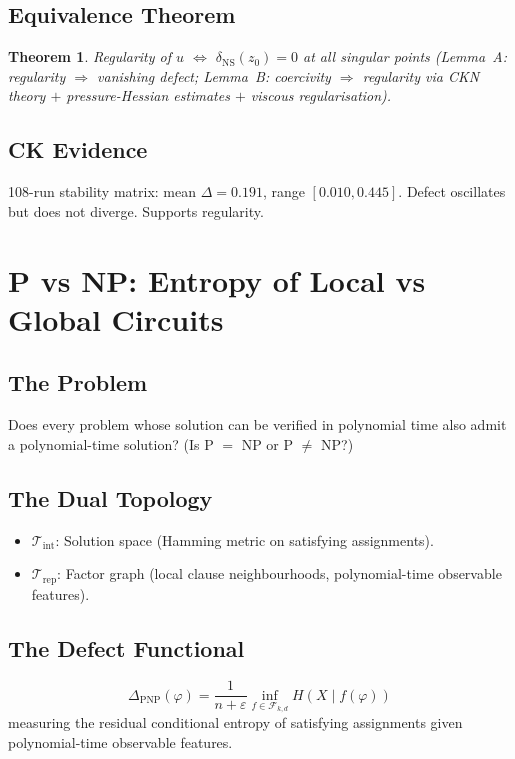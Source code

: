 \documentclass[12pt, openany]{book}
\newtheorem{theorem}{Theorem}[chapter]
\theoremstyle{remark}
\newcommand{\Tint}{\mathcal{T}_{\mathrm{int}}}
\newcommand{\Trep}{\mathcal{T}_{\mathrm{rep}}}
\begin{document}
\subsection{Equivalence Theorem}
\begin{theorem}
Regularity of $u$ $\Longleftrightarrow$ $\delta_{\mathrm{NS}}(z_0) = 0$ at all
singular points (Lemma~A: regularity $\Rightarrow$ vanishing defect;
Lemma~B: coercivity $\Rightarrow$ regularity via CKN theory $+$
pressure-Hessian estimates $+$ viscous regularisation).
\end{theorem}

\subsection{CK Evidence}
108-run stability matrix: mean $\Delta = 0.191$, range $[0.010, 0.445]$.
Defect oscillates but does not diverge. Supports regularity.


\section{P vs NP: Entropy of Local vs Global Circuits}
\label{sec:pnp}

\subsection{The Problem}
Does every problem whose solution can be verified in polynomial time also admit a
polynomial-time solution? (Is P $=$ NP or P $\neq$ NP?)

\subsection{The Dual Topology}
\begin{itemize}
  \item $\Tint$: Solution space (Hamming metric on satisfying assignments).
  \item $\Trep$: Factor graph (local clause neighbourhoods, polynomial-time observable features).
\end{itemize}

\subsection{The Defect Functional}
\[
  \boxed{\Delta_{\mathrm{PNP}}(\varphi) = \frac{1}{n + \varepsilon} \inf_{f \in \mathcal{F}_{k,d}} H(X \mid f(\varphi))}
\]
measuring the residual conditional entropy of satisfying assignments given
polynomial-time observable features.
\end{document}
